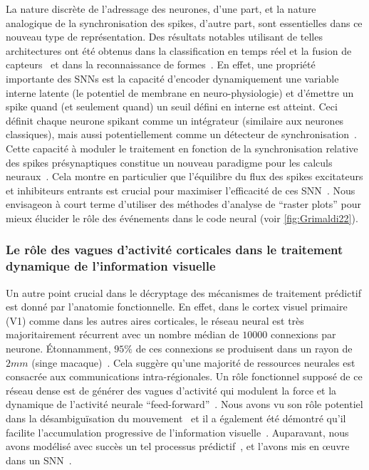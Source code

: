 La nature discrète de l'adressage des neurones, d'une part, et la nature
analogique de la synchronisation des spikes, d'autre part, sont
essentielles dans ce nouveau type de représentation. Des résultats
notables utilisant de telles architectures ont été obtenus dans la
classification en temps réel et la fusion de capteurs~\citep{Oconnor13} et dans la reconnaissance de formes~\citep{Lagorce17}. En
effet, une propriété importante des SNNs est la capacité d'encoder
dynamiquement une variable interne latente (le potentiel de membrane en
neuro-physiologie) et d'émettre un spike quand (et seulement quand) un
seuil défini en interne est atteint. Ceci définit chaque neurone spikant
comme un intégrateur (similaire aux neurones classiques), mais aussi
potentiellement comme un détecteur de synchronisation~\citep{Perrinet02}.
Cette capacité à moduler le traitement en fonction de la synchronisation
relative des spikes présynaptiques constitue un nouveau paradigme pour les
calculs neuraux~\citep{Paugam12}. Cela montre en
particulier que l'équilibre du flux des spikes excitateurs et inhibiteurs
entrants est crucial pour maximiser l'efficacité de ces SNN~\citep{Hansel12}. Nous envisageon à court terme d'utiliser des méthodes d'analyse de ``raster plots'' pour mieux élucider le rôle des événements dans le code neural (voir \ref{fig:Grimaldi22}).


\subsubsection{Le rôle des vagues d'activité corticales dans le traitement
dynamique de l'information
visuelle}
Un autre point crucial dans le décryptage des mécanismes de traitement
prédictif est donné par l'anatomie fonctionnelle. En effet, dans le
cortex visuel primaire (V1) comme dans les autres aires corticales, le
réseau neural est très majoritairement récurrent avec un nombre médian de $10000$
connexions par neurone. Étonnamment, $95 \%$ de ces connexions se
produisent dans un rayon de $2 mm$ (singe macaque)~\citep{Markov13}.
Cela suggère qu'une majorité de ressources neurales est consacrée aux
communications intra-régionales. Un rôle fonctionnel supposé de ce
réseau dense est de générer des vagues d'activité qui modulent la force
et la dynamique de l'activité neurale ``feed-forward''~\citep{Muller18}. Nous avons vu son rôle potentiel dans la désambiguïsation du
mouvement~\citep{Chemla19} et il a également été démontré qu'il
facilite l'accumulation progressive de l'information visuelle~\citep{Bringuier99}. Auparavant, nous avons modélisé avec succès un tel
processus prédictif~\citep{Perrinet12pred,Khoei13jpp,KhoeiMassonPerrinet17}, et l'avons mis en œuvre dans un SNN~\citep{Kaplan13}.

